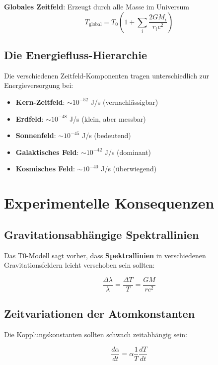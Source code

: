 \documentclass[12pt,a4paper]{report}
\begin{document}
\textbf{Globales Zeitfeld}: Erzeugt durch alle Masse im Universum
\begin{equation}
	T_{\text{global}} = T_0\left(1 + \sum_i \frac{2GM_i}{r_i c^2}\right)
\end{equation}

\subsection{Die Energiefluss-Hierarchie}

Die verschiedenen Zeitfeld-Komponenten tragen unterschiedlich zur Energieversorgung bei:

\begin{itemize}
	\item \textbf{Kern-Zeitfeld}: $\sim 10^{-52}$ J/s (vernachlässigbar)
	\item \textbf{Erdfeld}: $\sim 10^{-48}$ J/s (klein, aber messbar)
	\item \textbf{Sonnenfeld}: $\sim 10^{-45}$ J/s (bedeutend)
	\item \textbf{Galaktisches Feld}: $\sim 10^{-42}$ J/s (dominant)
	\item \textbf{Kosmisches Feld}: $\sim 10^{-40}$ J/s (überwiegend)
\end{itemize}

\section{Experimentelle Konsequenzen}

\subsection{Gravitationsabhängige Spektrallinien}

Das T0-Modell sagt vorher, dass \textbf{Spektrallinien} in verschiedenen Gravitationsfeldern leicht verschoben sein sollten:

\begin{equation}
	\frac{\Delta\lambda}{\lambda} = \frac{\Delta T}{T} = \frac{GM}{rc^2}
\end{equation}

\subsection{Zeitvariationen der Atomkonstanten}

Die Kopplungskonstanten sollten schwach zeitabhängig sein:

\begin{equation}
	\frac{d\alpha}{dt} = \alpha \frac{1}{T}\frac{dT}{dt}
\end{equation}
\end{document}
